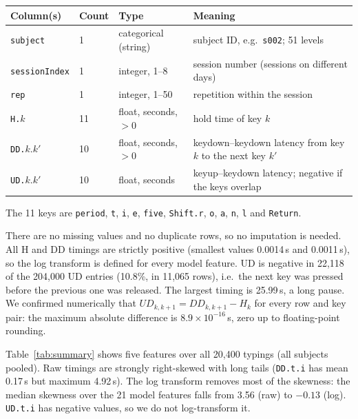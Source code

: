 \documentclass[11pt]{article}
\theoremstyle{definition}
\begin{document}
\begin{center}
\small
\begin{tabular}{@{}lllp{6cm}@{}}
\toprule
Column(s) & Count & Type & Meaning \\
\midrule
\texttt{subject} & 1 & categorical (string) & subject ID, e.g.\ \texttt{s002}; 51 levels \\
\texttt{sessionIndex} & 1 & integer, 1--8 & session number (sessions on different days) \\
\texttt{rep} & 1 & integer, 1--50 & repetition within the session \\
\texttt{H.}$k$ & 11 & float, seconds, $>0$ & hold time of key $k$ \\
\texttt{DD.}$k.k'$ & 10 & float, seconds, $>0$ & keydown--keydown latency from key $k$ to the next key $k'$ \\
\texttt{UD.}$k.k'$ & 10 & float, seconds & keyup--keydown latency; negative if the keys overlap \\
\bottomrule
\end{tabular}
\end{center}

The 11 keys are \texttt{period}, \texttt{t}, \texttt{i}, \texttt{e}, \texttt{five}, \texttt{Shift.r}, \texttt{o}, \texttt{a}, \texttt{n}, \texttt{l} and \texttt{Return}.

There are no missing values and no duplicate rows, so no imputation is needed. All H and DD timings are strictly positive (smallest values 0.0014\,s and 0.0011\,s), so the log transform is defined for every model feature. UD is negative in 22,118 of the 204,000 UD entries (10.8\%, in 11,065 rows), i.e.\ the next key was pressed before the previous one was released. The largest timing is 25.99\,s, a long pause. We confirmed numerically that $UD_{k,k+1}=DD_{k,k+1}-H_k$ for every row and key pair: the maximum absolute difference is $8.9\times10^{-16}$\,s, zero up to floating-point rounding.

Table~\ref{tab:summary} shows five features over all 20,400 typings (all subjects pooled). Raw timings are strongly right-skewed with long tails (\texttt{DD.t.i} has mean 0.17\,s but maximum 4.92\,s). The log transform removes most of the skewness: the median skewness over the 21 model features falls from 3.56 (raw) to $-0.13$ (log). \texttt{UD.t.i} has negative values, so we do not log-transform it.
\end{document}
